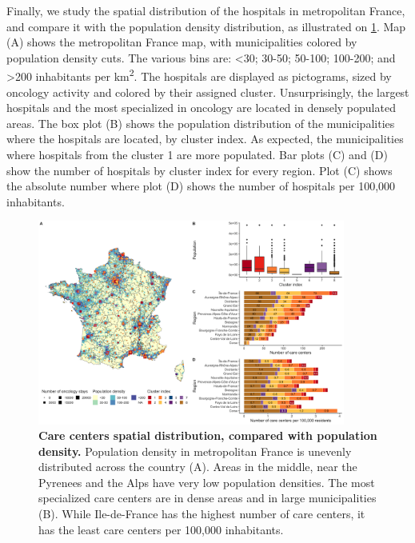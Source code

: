 Finally, we study the spatial distribution of the hospitals in metropolitan France,
and compare it with the population density distribution, as illustrated on
\cref{fig:clustering-map}. Map (A) shows the metropolitan France map, with
municipalities colored by population density cuts. The various bins are:
<30; 30-50; 50-100; 100-200; and >200 inhabitants per km\textsuperscript{2}. The
hospitals are displayed as pictograms, sized by oncology activity and colored
by their assigned cluster. Unsurprisingly, the largest hospitals and the most
specialized in oncology are located in densely populated areas. The box plot (B)
shows the population distribution of the municipalities where the hospitals are
located, by cluster index. As expected, the municipalities where hospitals from
the cluster 1 are more populated. Bar plots (C) and (D) show the number of
hospitals by cluster index for every region. Plot (C) shows the absolute number
where plot (D) shows the number of hospitals per 100,000 inhabitants.

\begin{figure}[H]
    \includegraphics[width=0.9\textwidth]{images/camion/supplemental/sup_fig4_care_centers_pop_density.png}
    \centering
    \caption{ \textbf{Care centers spatial distribution, compared with
            population density.} Population density in metropolitan France is
        unevenly distributed across the country (A). Areas in the middle, near
        the Pyrenees and the Alps have very low population densities. The most
        specialized care centers are in dense areas and in large municipalities
        (B). While Ile-de-France has the highest number of care centers, it has
        the least care centers per 100,000 inhabitants. }
    \label{fig:clustering-map}
\end{figure}

